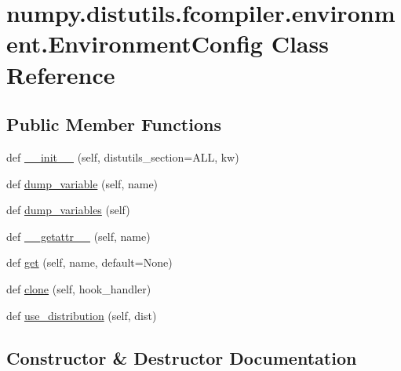\hypertarget{classnumpy_1_1distutils_1_1fcompiler_1_1environment_1_1EnvironmentConfig}{}\section{numpy.\+distutils.\+fcompiler.\+environment.\+Environment\+Config Class Reference}
\label{classnumpy_1_1distutils_1_1fcompiler_1_1environment_1_1EnvironmentConfig}
\subsection*{Public Member Functions}
\begin{DoxyCompactItemize}
\item 
def \hyperlink{classnumpy_1_1distutils_1_1fcompiler_1_1environment_1_1EnvironmentConfig_a7c3155f00406cfbf99325ca27061b526}{\+\_\+\+\_\+init\+\_\+\+\_\+} (self, distutils\+\_\+section=\textquotesingle{}A\+LL\textquotesingle{}, kw)
\item 
def \hyperlink{classnumpy_1_1distutils_1_1fcompiler_1_1environment_1_1EnvironmentConfig_a1802e594eefde1b8ce1fdc6335d437e3}{dump\+\_\+variable} (self, name)
\item 
def \hyperlink{classnumpy_1_1distutils_1_1fcompiler_1_1environment_1_1EnvironmentConfig_a358ed22e8f510c82a854c55ae7555d04}{dump\+\_\+variables} (self)
\item 
def \hyperlink{classnumpy_1_1distutils_1_1fcompiler_1_1environment_1_1EnvironmentConfig_ad8109af3c18beb8c5a9969cd7578e5a4}{\+\_\+\+\_\+getattr\+\_\+\+\_\+} (self, name)
\item 
def \hyperlink{classnumpy_1_1distutils_1_1fcompiler_1_1environment_1_1EnvironmentConfig_aefe2280b01a098e729000fe07f728abc}{get} (self, name, default=None)
\item 
def \hyperlink{classnumpy_1_1distutils_1_1fcompiler_1_1environment_1_1EnvironmentConfig_afa62c05404716188a34f85d046c96ffc}{clone} (self, hook\+\_\+handler)
\item 
def \hyperlink{classnumpy_1_1distutils_1_1fcompiler_1_1environment_1_1EnvironmentConfig_a87cdbc7895f71bf01d24f867f1a8142e}{use\+\_\+distribution} (self, dist)
\end{DoxyCompactItemize}


\subsection{Constructor \& Destructor Documentation}
\mbox{\label{classnumpy_1_1distutils_1_1fcompiler_1_1environment_1_1EnvironmentConfig_a7c3155f00406cfbf99325ca27061b526}} 
